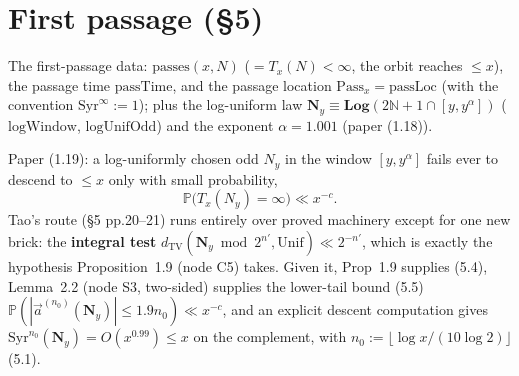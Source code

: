 \section{First passage (§5)}

\begin{definition}\label{C7d}
  \leanok
The first-passage data: \(\mathrm{passes}(x,N)\) (\(=T_x(N)<\infty\), the orbit reaches
\(\le x\)), the passage time \(\mathrm{passTime}\), and the passage location
\(\mathrm{Pass}_x = \mathrm{passLoc}\) (with the convention \(\mathrm{Syr}^\infty := 1\));
plus the log-uniform law \(\mathbf{N}_y \equiv \mathbf{Log}(2\mathbb{N}+1 \cap [y,y^\alpha])\)
(\(\mathrm{logWindow}\), \(\mathrm{logUnifOdd}\)) and the exponent \(\alpha = 1.001\) (paper (1.18)).
\end{definition}

\begin{lemma}\label{C7}
  \leanok
Paper (1.19): a log-uniformly chosen odd \(N_y\) in the window \([y,y^\alpha]\) fails ever to
descend to \(\le x\) only with small probability,
\[
  \mathbb{P}\bigl(T_x(N_y)=\infty\bigr) \ll x^{-c}.
\]
Tao's route (\S5 pp.20--21) runs entirely over proved machinery except for one new brick: the
\textbf{integral test} \(d_{\mathrm{TV}}(\mathbf{N}_y \bmod 2^{n'}, \mathrm{Unif}) \ll 2^{-n'}\),
which is exactly the hypothesis Proposition~1.9 (node C5) takes.  Given it, Prop~1.9 supplies
(5.4), Lemma~2.2 (node S3, two-sided) supplies the lower-tail bound (5.5)
\(\mathbb{P}(|\vec a^{(n_0)}(\mathbf{N}_y)| \le 1.9 n_0) \ll x^{-c}\), and an explicit descent
computation gives \(\mathrm{Syr}^{n_0}(\mathbf{N}_y) = O(x^{0.99}) \le x\) on the complement,
with \(n_0 := \lfloor \log x / (10\log 2)\rfloor\) (5.1).
\end{lemma}

